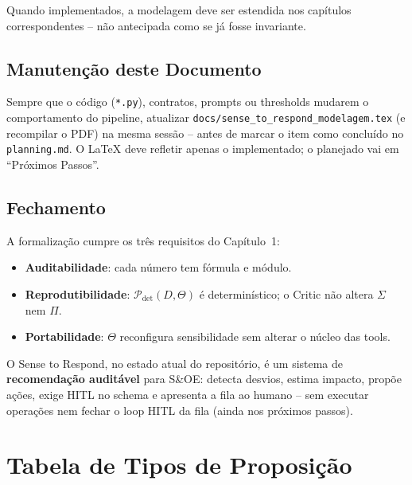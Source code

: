 \documentclass[a4paper, 12pt]{report}
\theoremstyle{definition}
\theoremstyle{remark}
\begin{document}
Quando implementados, a modelagem deve ser estendida nos cap\'itulos
correspondentes -- n\~ao antecipada como se j\'a fosse invariante.


\section{Manuten\c{c}\~ao deste Documento}

\begin{caixadecisao}
  Sempre que o c\'odigo (\texttt{*.py}), contratos, prompts ou
  thresholds mudarem o comportamento do pipeline, atualizar
  \texttt{docs/sense\_to\_respond\_modelagem.tex} (e recompilar o PDF)
  na mesma sess\~ao -- antes de marcar o item como conclu\'ido no
  \texttt{planning.md}. O LaTeX deve refletir apenas o implementado;
  o planejado vai em ``Pr\'oximos Passos''.
\end{caixadecisao}

\section{Fechamento}

A formaliza\c{c}\~ao cumpre os tr\^es requisitos do Cap\'itulo~1:

\begin{itemize}
  \item \textbf{Auditabilidade}: cada n\'umero tem f\'ormula e m\'odulo.
  \item \textbf{Reprodutibilidade}: $\mathcal{P}_{\text{det}}(D,\Theta)$
    \'e determin\'istico; o Critic n\~ao altera $\Sigma$ nem $\Pi$.
  \item \textbf{Portabilidade}: $\Theta$ reconfigura sensibilidade
    sem alterar o n\'ucleo das tools.
\end{itemize}

O Sense to Respond, no estado atual do reposit\'orio, \'e um sistema
de \textbf{recomenda\c{c}\~ao audit\'avel} para S\&OE: detecta desvios,
estima impacto, prop\~oe a\c{c}\~oes, exige HITL no schema e apresenta
a fila ao humano -- sem executar opera\c{c}\~oes nem fechar o loop
HITL da fila (ainda nos pr\'oximos passos).


\appendix
\chapter{Tabela de Tipos de Proposi\c{c}\~ao}
\end{document}
